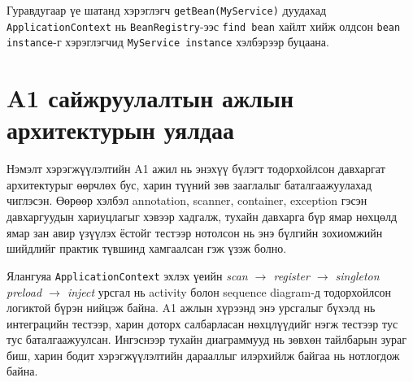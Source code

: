 Гуравдугаар үе шатанд хэрэглэгч
\texttt{getBean(MyService)} дуудахад
\texttt{ApplicationContext} нь \texttt{BeanRegistry}-ээс
\texttt{find bean} хайлт хийж олдсон
\texttt{bean instance}-г хэрэглэгчид
\texttt{MyService instance} хэлбэрээр буцаана.

\newpage

\section{A1 сайжруулалтын ажлын архитектурын уялдаа}

Нэмэлт хэрэгжүүлэлтийн A1 ажил нь энэхүү бүлэгт тодорхойлсон давхаргат архитектурыг өөрчлөх бус, харин түүний зөв зааглалыг баталгаажуулахад чиглэсэн. Өөрөөр хэлбэл annotation, scanner, container, exception гэсэн давхаргуудын хариуцлагыг хэвээр хадгалж, тухайн давхарга бүр ямар нөхцөлд ямар зан авир үзүүлэх ёстойг тестээр нотолсон нь энэ бүлгийн зохиомжийн шийдлийг практик түвшинд хамгаалсан гэж үзэж болно.

Ялангуяа \texttt{ApplicationContext} эхлэх үеийн \textit{scan $\rightarrow$ register $\rightarrow$ singleton preload $\rightarrow$ inject} урсгал нь activity болон sequence diagram-д тодорхойлсон логиктой бүрэн нийцэж байна. A1 ажлын хүрээнд энэ урсгалыг бүхэлд нь интеграцийн тестээр, харин доторх салбарласан нөхцлүүдийг нэгж тестээр тус тус баталгаажуулсан. Ингэснээр тухайн диаграммууд нь зөвхөн тайлбарын зураг биш, харин бодит хэрэгжүүлэлтийн дарааллыг илэрхийлж байгаа нь нотлогдож байна.


